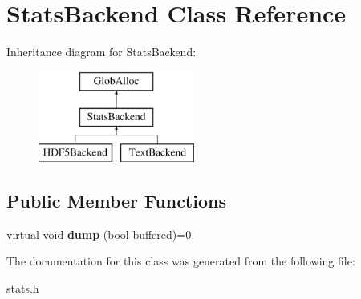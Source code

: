 \hypertarget{classStatsBackend}{\section{Stats\-Backend Class Reference}
\label{classStatsBackend}
}
Inheritance diagram for Stats\-Backend\-:\begin{figure}[H]
\begin{center}
\leavevmode
\includegraphics[height=3.000000cm]{classStatsBackend}
\end{center}
\end{figure}
\subsection*{Public Member Functions}
\begin{DoxyCompactItemize}
\item 
\hypertarget{classStatsBackend_ad4c882d3d8c18f5d013373348c2b40af}{virtual void {\bfseries dump} (bool buffered)=0}\label{classStatsBackend_ad4c882d3d8c18f5d013373348c2b40af}

\end{DoxyCompactItemize}


The documentation for this class was generated from the following file\-:\begin{DoxyCompactItemize}
\item 
stats.\-h\end{DoxyCompactItemize}

